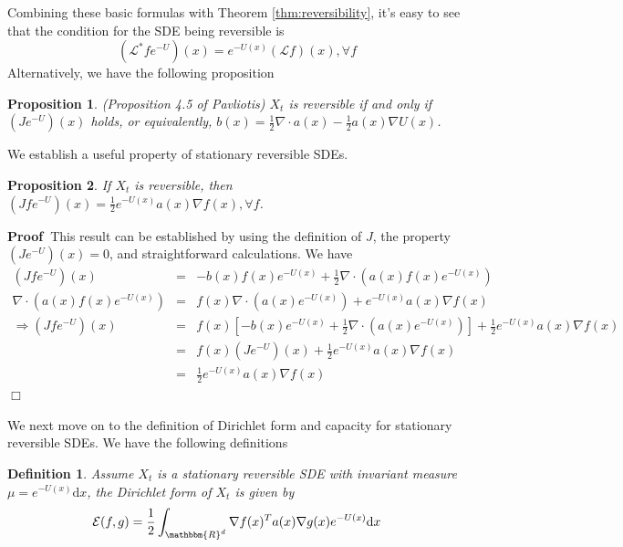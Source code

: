 \documentclass[english, aip, jcp, priprint, graphicx,floatfix]{revtex4-1}
\newtheorem{definition}{Definition}
\newtheorem{proposition}{Proposition}
\theoremstyle{plain}
\theoremstyle{definition}
\theoremstyle{plain}
\begin{document}
Combining these basic formulas with Theorem \ref{thm:reversibility}, it's easy
to see that the condition for the SDE being reversible is
\[ (\mathcal{L}^{\ast} f e^{-U}) (x) = e^{- U (x)} (\mathcal{L} f) (x),
\forall f \]
Alternatively, we have the following proposition

\begin{proposition}
(Proposition 4.5 of Pavliotis\cite{Pavliotis2016-xn}) $X_t$ is reversible if
and only if $(J e^{- U })(x)$ holds, or equivalently, $b (x) = \frac{1}{2}
\nabla \cdot a (x) - \frac{1}{2} a (x) \nabla U (x)$.
\end{proposition}

We establish a useful property of stationary reversible SDEs.

\begin{proposition}\label{prop:property_reversible_sde}
If $X_t$ is reversible, then $(J f e^{- U })(x) = \frac{1}{2} e^{- U
(x)} a (x) \nabla f (x) , \forall f$.
\end{proposition}

\noindent\textbf{Proof\ }This result can be established by using the
definition of $J$, the property $(J e^{- U })(x) = 0$, and straightforward
calculations. We have
\begin{eqnarray*}
(J f e^{- U })(x) & = & - b (x) f (x) e^{- U (x)} + \frac{1}{2} \nabla
\cdot (a (x) f (x) e^{- U (x)})\\
\nabla \cdot (a (x) f (x) e^{- U (x)}) & = & f (x) \nabla \cdot (a (x) e^{-
U (x)}) + e^{- U (x)} a (x) \nabla f (x)\\
\Longrightarrow (J f e^{- U })(x) & = & f (x) \left[ - b (x) e^{- U (x)}
+ \frac{1}{2} \nabla \cdot (a (x) e^{- U (x)}) \right] + \frac{1}{2} e^{- U
(x)} a (x) \nabla f (x)\\
& = & f (x) (J e^{- U })(x) + \frac{1}{2} e^{- U (x)} a (x) \nabla f (x)\\
& = & \frac{1}{2} e^{- U (x)} a (x) \nabla f (x)
\end{eqnarray*}\hspace*{\fill}$\Box$\medskip

We next move on to the definition of Dirichlet form and capacity for
stationary reversible SDEs. We have the following definitions

\begin{definition}
Assume $X_t$ is a stationary reversible SDE with invariant measure
${\mu}= e^{- U (x)} \mathrm{d} x$, the Dirichlet form of $X_t$ is given
by
\[ \mathcal{E} (f, g) = \frac{1}{2} \int_{\mathbbm{R}^d} \nabla f (x)^T a
(x) \nabla g (x) e^{- U (x)} \mathrm{d} x \]
\end{definition}
\end{document}
